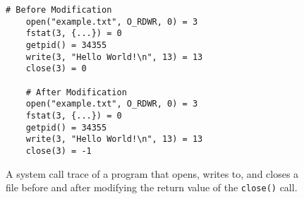 %
%
%
\begin{figure}
  \begin{lstlisting}[gobble=4]
    # Before Modification
    open("example.txt", O_RDWR, 0) = 3
    fstat(3, {...}) = 0
    getpid() = 34355
    write(3, "Hello World!\n", 13) = 13
    close(3) = 0

    # After Modification
    open("example.txt", O_RDWR, 0) = 3
    fstat(3, {...}) = 0
    getpid() = 34355
    write(3, "Hello World!\n", 13) = 13
    close(3) = -1
  \end{lstlisting}
  \caption{A system call trace of a program that opens, writes to, and closes
  a file before and after modifying the return value of the \texttt{close()} call.}
  \label{fig:StraceListing}
\end{figure}

